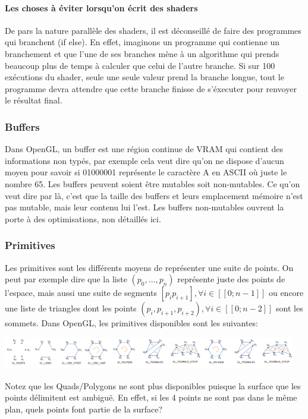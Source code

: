 \documentclass[a4paper,10pt]{report}
\begin{document}
\paragraph{Les choses à éviter lorsqu'on écrit des shaders} De pars la nature parallèle des shaders, il est déconseillé de faire des programmes qui branchent (if else). En effet, imaginons un programme qui contienne un branchement et que l'une de ses branches mène à un algorithme qui prends beaucoup plus de temps à calculer que celui de l'autre branche. Si sur 100 exécutions du shader, seule une seule valeur prend la branche longue, tout le programme devra attendre que cette branche finisse de s'éxecuter pour renvoyer le résultat final.

\subsubsection{Buffers}
Dans OpenGL, un buffer est une région continue de VRAM qui contient des informations non typés, par exemple cela veut dire qu'on ne dispose d'aucun moyen pour savoir si 01000001 représente le caractère A en ASCII où juste le nombre 65.
Les buffers peuvent soient être mutables soit non-mutables. Ce qu'on veut dire par là, c'est que la taille des buffers et leurs emplacement mémoire n'est pas mutable, mais leur contenu lui l'est. Les buffers non-mutables ouvrent la porte à des optimisations, non détaillés ici.

\subsubsection{Primitives}
\label{subsubsec:Primitives}
Les primitives sont les différents moyens de représenter une suite de points. On peut par exemple dire que la liste $(p_0, ..., p_n)$ représente juste des points de l'espace, mais aussi une suite de segments $[p_ip_{i+1}], \forall i \in  [\![0;n-1]\!]$ ou encore une liste de triangles dont les points $(p_i, p_{i+1}, p_{i+2}), \forall i \in  [\![0;n-2]\!]$ sont les sommets. Dans OpenGL, les primitives disponibles sont les suivantes:

\includegraphics[width=0.96\textwidth]{OpenGL_primitives_flattened}

Notez que les Quads/Polygons ne sont plus disponibles puisque la surface que les points délimitent est ambiguë. En effet, si les 4 points ne sont pas dans le même plan, quels points font partie de la surface?
\end{document}
